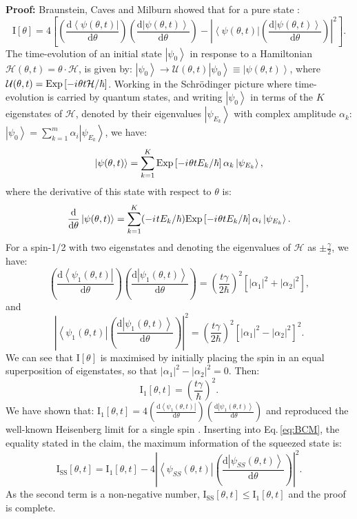 \documentclass[reqno]{amsart}
\def\be{\begin{equation}}
\def\ee{\end{equation}}
\newcommand{\ket}[1]{\left| #1 \right>}
\newcommand{\bra}[1]{\left< #1 \right|}
\newcommand{\hham}{\mathcal{H}}
\newcommand{\iu}{{i\mkern1mu}}
\def\func#1#2{\mathrm{#1}\left[#2\right]}
\def\funcwrt#1#2#3{\mathrm{#1}_{\mathrm{#3}}\left[#2\right]}
\begin{document}
\textbf{Proof:} Braunstein, Caves and Milburn showed that for a pure state \cite{Braunstein1996}:
\be
\func{I}{\theta} = 4\left[\left(\frac{\mathrm{d}\bra{\psi(\theta,t)}}{\mathrm{d} \theta}\right)\left(\frac{\mathrm{d}\ket{\psi(\theta,t)}}{\mathrm{d} \theta}\right) - \left|\bra{\psi(\theta,t)}\left(\frac{\mathrm{d}\ket{\psi(\theta,t)}}{\mathrm{d} \theta}\right)\right|^2\right].
\label{eq:BCM}
\ee
The time-evolution of an initial state $\ket{\psi_0}$ in response to a Hamiltonian $\hham(\theta,t) = \theta \cdot \hham$, is given by: $\ket{\psi_0} \rightarrow \mathcal{U}(\theta, t)\ket{\psi_0} \equiv \ket{\psi(\theta,t)}$, where $\mathcal{U}(\theta,t) = \func{Exp}{-\iu \theta t \hham /\hbar}$. Working in the Schr\"odinger picture where time-evolution is carried by quantum states, and writing $\ket{\psi_0}$ in terms of the $K$ eigenstates of $\hham$, denoted by their eigenvalues $\ket{\psi_{E_k}}$ with complex amplitude $\alpha_k$: $\ket{\psi_0} = \sum_{k = 1}^m \alpha_i \ket{\psi_{E_k}}$, we have:
\[ \ket{\psi(\theta,t)} = \sum_{k = 1}^K \func{Exp}{-\iu \theta t E_k/\hbar}\alpha_k \ket{\psi_{E_k}}, \]
where the derivative of this state with respect to $\theta$ is:
\[ \frac{\mathrm{d}}{\mathrm{d}\theta}\ket{\psi(\theta,t)} = \sum_{k = 1}^K (-\iu t E_k/\hbar) \func{Exp}{-\iu \theta t E_k/\hbar}\alpha_i \ket{\psi_{E_k}}.\]
For a spin-1/2 with two eigenstates and denoting the eigenvalues of $\hham$ as $\pm \frac{\gamma}{2}$, we have:
\[ \left(\frac{\mathrm{d}\bra{\psi_1(\theta,t)}}{\mathrm{d} \theta}\right)\left(\frac{\mathrm{d}\ket{\psi_1(\theta,t)}}{\mathrm{d} \theta}\right) = \left(\frac{t \gamma}{2\hbar}\right)^2 \left[ |\alpha_1|^2 + |\alpha_2|^2 \right], \]
and
\[ \left|\bra{\psi_1(\theta,t)}\left(\frac{\mathrm{d}\ket{\psi_1(\theta,t)}}{\mathrm{d} \theta}\right)\right|^2 = \left(\frac{t \gamma}{2 \hbar}\right)^2 \left[ |\alpha_1|^2 - |\alpha_2|^2 \right]^2.\]
We can see that $\func{I}{\theta}$ is maximised by initially placing the spin in an equal superposition of eigenstates, so that $|\alpha_1|^2 - |\alpha_2|^2 = 0$. Then: 
\[\funcwrt{I}{\theta,t}{1} = \left(\frac{t \gamma}{\hbar}\right)^2.\]
We have shown that: $\funcwrt{I}{\theta,t}{1} = 4\left(\frac{\mathrm{d}\bra{\psi_1(\theta,t)}}{\mathrm{d} \theta}\right)\left(\frac{\mathrm{d}\ket{\psi_1(\theta,t)}}{\mathrm{d} \theta}\right)$ and reproduced the well-known Heisenberg limit for a single spin \cite{Bollinger1996, Giovannetti2004, Pang2014}. Inserting into Eq.\,\eqref{eq:BCM}, the equality stated in the claim, the maximum information of the squeezed state is:
\[%
\funcwrt{I}{\theta,t}{SS} = \funcwrt{I}{\theta,t}{1} - 4\left|\bra{\psi_{SS}(\theta,t)}\left(\frac{\mathrm{d}\ket{\psi_{SS}(\theta,t)}}{\mathrm{d} \theta}\right)\right|^2.
\]%
As the second term is a non-negative number, $\funcwrt{I}{\theta,t}{SS} \leq \funcwrt{I}{\theta,t}{1}$ and the proof is complete.
\end{document}
